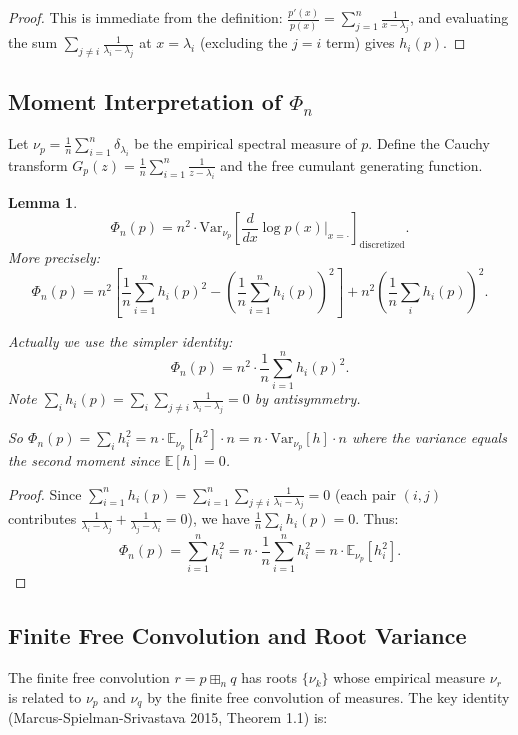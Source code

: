 \documentclass[12pt]{article}
\newtheorem{lemma}{Lemma}
\theoremstyle{definition}
\begin{document}
\begin{proof}
This is immediate from the definition: $\frac{p'(x)}{p(x)} = \sum_{j=1}^n \frac{1}{x-\lambda_j}$, and evaluating the sum $\sum_{j\neq i}\frac{1}{\lambda_i-\lambda_j}$ at $x=\lambda_i$ (excluding the $j=i$ term) gives $h_i(p)$.
\end{proof}

\subsection{Moment Interpretation of $\Phi_n$}

Let $\nu_p = \frac{1}{n}\sum_{i=1}^n \delta_{\lambda_i}$ be the empirical spectral measure of $p$. Define the Cauchy transform $G_p(z) = \frac{1}{n}\sum_{i=1}^n\frac{1}{z-\lambda_i}$ and the free cumulant generating function.

\begin{lemma}\label{lem:phi-variance}
$$\Phi_n(p) = n^2 \cdot \mathrm{Var}_{\nu_p}\!\left[\frac{d}{dx}\log p(x)\bigg|_{x=\cdot}\right]_{\mathrm{discretized}}.$$
More precisely:
$$\Phi_n(p) = n^2\left[\frac{1}{n}\sum_{i=1}^n h_i(p)^2 - \left(\frac{1}{n}\sum_{i=1}^n h_i(p)\right)^2\right] + n^2\left(\frac{1}{n}\sum_i h_i(p)\right)^2.$$

Actually we use the simpler identity:
$$\Phi_n(p) = n^2 \cdot \frac{1}{n}\sum_{i=1}^n h_i(p)^2.$$
Note $\sum_i h_i(p) = \sum_i\sum_{j\neq i}\frac{1}{\lambda_i-\lambda_j} = 0$ by antisymmetry.

So $\Phi_n(p) = \sum_i h_i^2 = n\cdot \mathbb{E}_{\nu_p}[h^2] \cdot n = n\cdot\mathrm{Var}_{\nu_p}[h] \cdot n$ where the variance equals the second moment since $\mathbb{E}[h]=0$.
\end{lemma}

\begin{proof}
Since $\sum_{i=1}^n h_i(p) = \sum_{i=1}^n\sum_{j\neq i}\frac{1}{\lambda_i-\lambda_j} = 0$ (each pair $(i,j)$ contributes $\frac{1}{\lambda_i-\lambda_j}+\frac{1}{\lambda_j-\lambda_i}=0$), we have $\frac{1}{n}\sum_i h_i(p) = 0$. Thus:
$$\Phi_n(p) = \sum_{i=1}^n h_i^2 = n \cdot \frac{1}{n}\sum_{i=1}^n h_i^2 = n\cdot\mathbb{E}_{\nu_p}[h_i^2].$$
\end{proof}

\subsection{Finite Free Convolution and Root Variance}

The finite free convolution $r = p\boxplus_n q$ has roots $\{\nu_k\}$ whose empirical measure $\nu_r$ is related to $\nu_p$ and $\nu_q$ by the finite free convolution of measures. The key identity (Marcus-Spielman-Srivastava 2015, Theorem 1.1) is:
\end{document}
